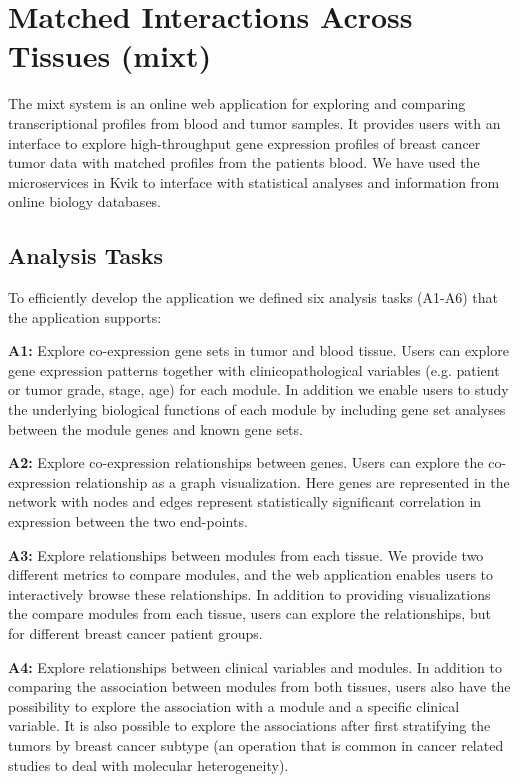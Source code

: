 \section{Matched Interactions Across Tissues (\gls{mixt})}
The \gls{mixt} system is an online web application for exploring and comparing
transcriptional profiles from blood and tumor
samples.\cite{fjukstad2017building,dumeaux2017interactions} It provides users
with an interface to explore high-throughput gene expression profiles of breast
cancer tumor data with matched profiles from the patients blood. We have used
the microservices in Kvik to interface with statistical analyses and information
from online biology databases. 

\subsection{Analysis Tasks} 
To efficiently develop
the application we defined six analysis tasks (A1-A6) that the application
supports: 

\textbf{A1:} Explore co-expression gene sets in tumor and blood tissue.  Users
can explore gene expression patterns together with clinicopathological variables
(e.g. patient or tumor grade, stage, age) for each module.  In addition we
enable users to study the underlying biological functions of each module by
including gene set analyses between the module genes and known gene sets. 

\textbf{A2:} Explore co-expression relationships between genes. Users can
explore the co-expression relationship as a graph visualization. 
Here genes are represented in the network with nodes and edges represent 
statistically significant correlation in expression between the two end-points. 

\textbf{A3:} Explore relationships between modules from each tissue. We provide
two different metrics to compare modules, and the web application enables users
to interactively browse these relationships.  In addition to providing
visualizations the compare modules from each tissue, users can explore the
relationships, but for different breast cancer patient groups. 

\textbf{A4:} Explore relationships between clinical variables and modules. In
addition to comparing the association between modules from both tissues, users
also have the possibility to explore the association with a module and a
specific clinical variable. It is also possible to explore the associations
after first stratifying the tumors by breast cancer subtype (an operation that
is common in cancer related studies to deal with molecular heterogeneity).

